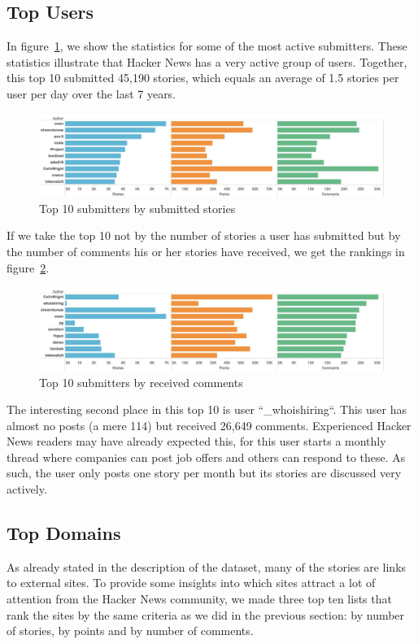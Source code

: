 \subsection{Top Users}
In figure~\ref{fig:top10ByStories}, we show the statistics for some of the most active submitters. These statistics illustrate that Hacker News has a very active group of users. Together, this top 10 submitted 45,190 stories, which equals an average of 1.5 stories per user per day over the last 7 years.
\begin{figure}[ht!]
	\caption{Top 10 submitters by submitted stories}
	\label{fig:top10ByStories}
	\centering
	\includegraphics[width=14cm]{top10ByStories}
\end{figure}

If we take the top 10 not by the number of stories a user has submitted but by the number of comments his or her stories have received, we get the rankings in figure~\ref{fig:top10ByComments}.

\begin{figure}[ht!]
	\caption{Top 10 submitters by received comments}
	\label{fig:top10ByComments}
	\centering
	\includegraphics[width=14cm]{top10ByComments}
\end{figure}

The interesting second place in this top 10 is user ``\_whoishiring``. This user has almost no posts (a mere 114) but received 26,649 comments. Experienced Hacker News readers may have already expected this, for this user starts a monthly thread where companies can post job offers and others can respond to these. As such, the user only posts one story per month but its stories are discussed very actively.

\subsection{Top Domains}
As already stated in the description of the dataset, many of the stories are links to external sites. To provide some insights into which sites attract a lot of attention from the Hacker News community, we made three top ten lists that rank the sites by the same criteria as we did in the previous section: by number of stories, by points and by number of comments.


